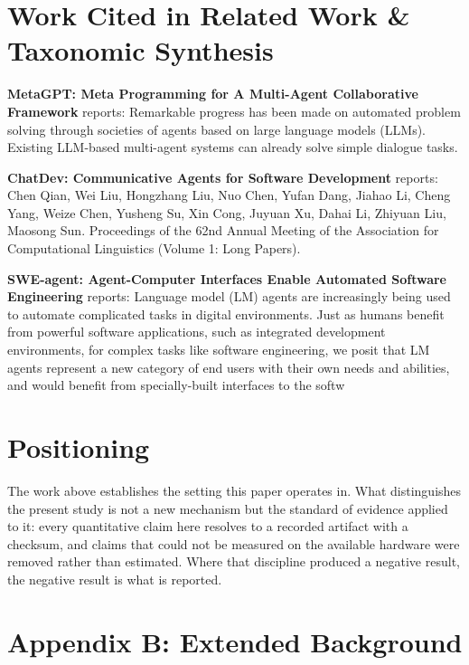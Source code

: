 \documentclass{article}
\begin{document}
\section{Work Cited in Related Work \& Taxonomic Synthesis}


\textbf{MetaGPT: Meta Programming for A Multi-Agent Collaborative Framework} \cite{crossref_10_48550_arxiv_2308_00352} reports: Remarkable progress has been made on automated problem solving through societies of agents based on large language models (LLMs). Existing LLM-based multi-agent systems can already solve simple dialogue tasks.

\textbf{ChatDev: Communicative Agents for Software Development} \cite{crossref_10_18653_v1_2024_acl_long_810} reports: Chen Qian, Wei Liu, Hongzhang Liu, Nuo Chen, Yufan Dang, Jiahao Li, Cheng Yang, Weize Chen, Yusheng Su, Xin Cong, Juyuan Xu, Dahai Li, Zhiyuan Liu, Maosong Sun. Proceedings of the 62nd Annual Meeting of the Association for Computational Linguistics (Volume 1: Long Papers).

\textbf{SWE-agent: Agent-Computer Interfaces Enable Automated Software Engineering} \cite{crossref_10_48550_arxiv_2405_15793} reports: Language model (LM) agents are increasingly being used to automate complicated tasks in digital environments. Just as humans benefit from powerful software applications, such as integrated development environments, for complex tasks like software engineering, we posit that LM agents represent a new category of end users with their own needs and abilities, and would benefit from specially-built interfaces to the softw


\section{Positioning}


The work above establishes the setting this paper operates in. What distinguishes the present study is not a new mechanism but the standard of evidence applied to it: every quantitative claim here resolves to a recorded artifact with a checksum, and claims that could not be measured on the available hardware were removed rather than estimated. Where that discipline produced a negative result, the negative result is what is reported.




\section{Appendix B: Extended Background}
\end{document}

